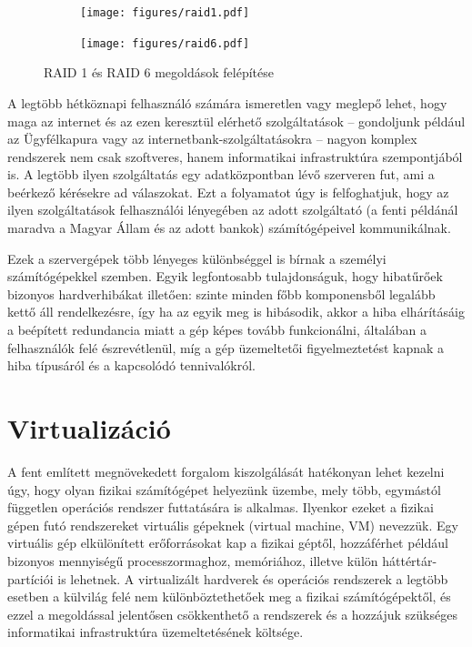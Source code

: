 \begin{figure}[!ht]
	
	\centering
	\begin{subfigure}{0.3\textwidth}
		\centering
		\texttt{[image: figures/raid1.pdf]}
	\end{subfigure}
	\hspace{0.05\textwidth}
	\begin{subfigure}{0.6\textwidth}
		\centering
		\texttt{[image: figures/raid6.pdf]}
	\end{subfigure}
	\caption{RAID 1 és RAID 6 megoldások felépítése \cite{WikiRaidLevels}}
	\label{fig:raid}
\end{figure}

A legtöbb hétköznapi felhasználó számára ismeretlen vagy meglepő lehet, hogy maga az internet és az ezen keresztül elérhető szolgáltatások -- gondoljunk például az Ügyfélkapura vagy az internetbank-szolgáltatásokra -- nagyon komplex rendszerek nem csak szoftveres, hanem informatikai infrastruktúra szempontjából is. A legtöbb ilyen szolgáltatás egy adatközpontban lévő szerveren fut, ami a beérkező kérésekre ad válaszokat. Ezt a folyamatot úgy is felfoghatjuk, hogy az ilyen szolgáltatások felhasználói lényegében az adott szolgáltató (a fenti példánál maradva a Magyar Állam és az adott bankok) számítógépeivel kommunikálnak.

Ezek a szervergépek több lényeges különbséggel is bírnak a személyi számítógépekkel szemben. Egyik legfontosabb tulajdonságuk, hogy hibatűrőek bizonyos hardverhibákat illetően: szinte minden főbb komponensből legalább kettő áll rendelkezésre, így ha az egyik meg is hibásodik, akkor a hiba elhárításáig a beépített redundancia miatt a gép képes tovább funkcionálni, általában a felhasználók felé észrevétlenül, míg a gép üzemeltetői figyelmeztetést kapnak a hiba típusáról és a kapcsolódó tennivalókról.

\section{Virtualizáció}
A fent említett megnövekedett forgalom kiszolgálását hatékonyan lehet kezelni úgy, hogy olyan fizikai számítógépet helyezünk üzembe, mely  több, egymástól független operációs rendszer futtatására is alkalmas. Ilyenkor ezeket a fizikai gépen futó rendszereket virtuális gépeknek (virtual machine, VM) %
nevezzük. Egy virtuális gép elkülönített erőforrásokat kap a fizikai géptől, hozzáférhet például bizonyos mennyiségű processzormaghoz, memóriához, illetve külön háttértár-partíciói is lehetnek. A virtualizált hardverek és operációs rendszerek a legtöbb esetben a külvilág felé nem különböztethetőek meg a fizikai számítógépektől, és ezzel a megoldással jelentősen csökkenthető a rendszerek és a hozzájuk szükséges informatikai infrastruktúra üzemeltetésének költsége.


